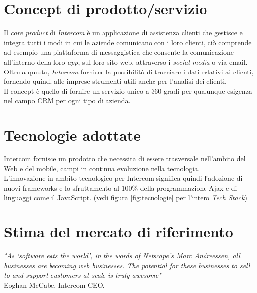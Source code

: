 \documentclass[a4paper, 11pt]{article}
\begin{document}
\section*{Concept di prodotto/servizio}
\par 
Il \emph{core product} di \textit{Intercom} è un applicazione di assistenza clienti che gestisce e integra tutti i modi in cui le aziende comunicano con i loro clienti, ciò comprende ad esempio una piattaforma di messaggistica che consente la comunicazione all'interno della loro \textit{app}, sul loro sito web, attraverso i \textit{social media} o via email.\\
Oltre a questo, \textit{Intercom} fornisce la possibilità di tracciare i dati relativi ai clienti, fornendo quindi alle imprese strumenti utili anche per l'analisi dei clienti.\\
Il concept è quello di fornire un servizio unico a 360 gradi per qualunque esigenza nel campo CRM per ogni tipo di azienda.\par
\section*{Tecnologie adottate}
Intercom fornisce un prodotto che necessita di essere trasversale nell'ambito del Web e del mobile, campi in continua evoluzione nella tecnologia.\\
L'innovazione in ambito tecnologico per Intercom significa quindi l'adozione di nuovi frameworks e lo sfruttamento al 100\% della programmazione Ajax e di linguaggi come il JavaScript. (vedi figura \ref{fig:tecnologie} per l'intero \textit{Tech Stack})

\section*{Stima del mercato di riferimento}

\emph{"As ‘software eats the world’, in the words of Netscape’s Marc Andreessen, all businesses are becoming web businesses. The potential for these businesses to sell to and support customers at scale is truly awesome"  \cite{Pamela}}\\
\null \hfill Eoghan McCabe, Intercom CEO.
\end{document}
